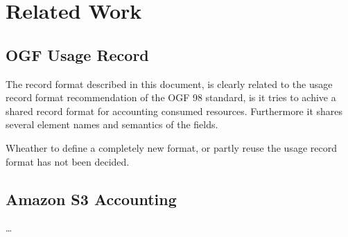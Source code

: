 \section{Related Work}


\subsection{OGF Usage Record}

The record format described in this document, is clearly related to the usage
record format recommendation of the OGF 98 standard, is it tries to achive a
shared record format for accounting consumed resources. Furthermore it shares
several element names and semantics of the fields.

Wheather to define a completely new format, or partly reuse the usage record
format has not been decided.


\subsection{Amazon S3 Accounting}

\ldots

